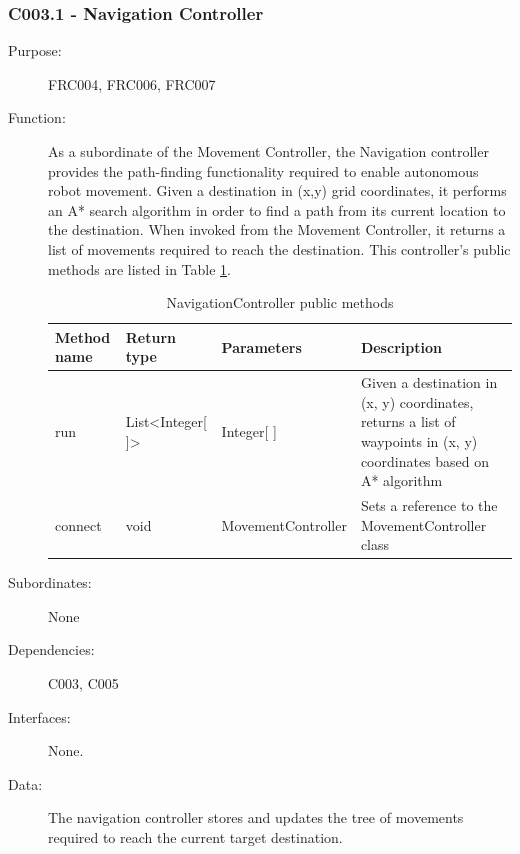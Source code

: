 \documentclass[12pt]{article}
\begin{document}
\subsubsection{C003.1 - Navigation Controller}\label{navigation}
\begin{description}
\item [{Purpose:}] FRC004, FRC006, FRC007
\item [{Function: }] As a subordinate of the Movement Controller, the Navigation controller provides the path-finding functionality required to enable autonomous robot movement. Given a destination in (x,y) grid coordinates, it performs an A* search algorithm in order to find a path from its current location to the destination. When invoked from the Movement Controller, it returns a list of movements required to reach the destination. This controller's public methods are listed in Table \ref{table:navigation}.

\begin{table}
\begin{tabular}{ | p{} | p{} |p{}|p{}|}
\hline
\textbf{Method name} & \textbf{Return type} & \textbf{Parameters} & \textbf{Description} \\
\hline
run & List<Integer[ ]> & Integer[ ] & Given a destination in (x, y) coordinates, returns a list of waypoints in (x, y) coordinates based on A* algorithm \\
\hline
connect & void & MovementController & Sets a reference to the MovementController class \\
\hline
\end{tabular}
\caption{NavigationController public methods}
\label{table:navigation}
\end{table}

\item[{Subordinates: }] None
\item[{Dependencies: }] C003, C005
\item[{Interfaces: }] None.
\item[{Data: }] The navigation controller stores and updates the tree of movements required to reach the current target destination.
\end{description}

\FloatBarrier
\end{document}
